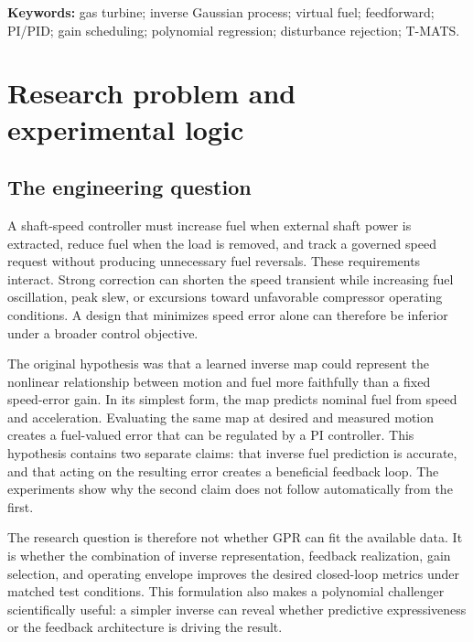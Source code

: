 \documentclass[11pt,a4paper,oneside]{report}
\begin{document}
\textbf{Keywords:} gas turbine; inverse Gaussian process; virtual fuel; feedforward; PI/PID; gain scheduling; polynomial regression; disturbance rejection; T-MATS.
\tableofcontents
\clearpage\listoffigures
\clearpage\listoftables
\clearpage{}

\chapter{Research problem and experimental logic}
\section{The engineering question}
A shaft-speed controller must increase fuel when external shaft power is extracted, reduce fuel when the load is removed, and track a governed speed request without producing unnecessary fuel reversals. These requirements interact. Strong correction can shorten the speed transient while increasing fuel oscillation, peak slew, or excursions toward unfavorable compressor operating conditions. A design that minimizes speed error alone can therefore be inferior under a broader control objective.

The original hypothesis was that a learned inverse map could represent the nonlinear relationship between motion and fuel more faithfully than a fixed speed-error gain. In its simplest form, the map predicts nominal fuel from speed and acceleration. Evaluating the same map at desired and measured motion creates a fuel-valued error that can be regulated by a PI controller. This hypothesis contains two separate claims: that inverse fuel prediction is accurate, and that acting on the resulting error creates a beneficial feedback loop. The experiments show why the second claim does not follow automatically from the first.

The research question is therefore not whether GPR can fit the available data. It is whether the combination of inverse representation, feedback realization, gain selection, and operating envelope improves the desired closed-loop metrics under matched test conditions. This formulation also makes a polynomial challenger scientifically useful: a simpler inverse can reveal whether predictive expressiveness or the feedback architecture is driving the result.
\end{document}
